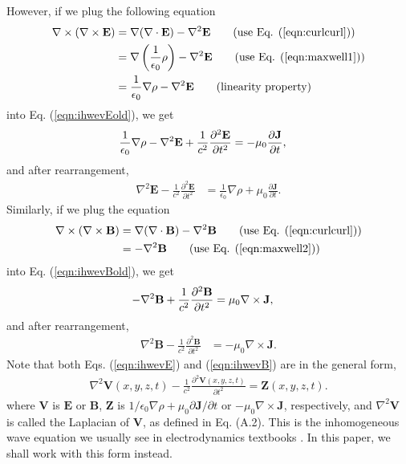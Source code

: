 \documentclass[11pt]{article}              %
\begin{document}
However, if we plug the following equation
\begin{align}
\nabla\times(\nabla\times{\mathbf E})&=\nabla(\nabla\cdot{\mathbf E})-\nabla^2{\mathbf E}\tag{use Eq. (\ref{eqn:curlcurl})}\\
&=\nabla\left(\frac{1}{\epsilon_0}\rho\right)-\nabla^2{\mathbf E}\tag{use Eq. (\ref{eqn:maxwell1})}\\
&=\frac{1}{\epsilon_0}\nabla\rho-\nabla^2{\mathbf E}\tag{linearity property}
\end{align}
into Eq. (\ref{eqn:ihwevEold}), we get
\begin{align}
    \frac{1}{\epsilon_0}\nabla\rho-\nabla^2{\mathbf E}+\frac{1}{c^2}\frac{\partial^2{\mathbf E}}{\partial t^2}&=-\mu_0\frac{\partial {\mathbf J}}{\partial t},\notag
\end{align}
and after rearrangement, 
\begin{align}
\nabla^2{\mathbf E}-\frac{1}{c^2}\frac{\partial^2{\mathbf E}}{\partial t^2}&=\frac{1}{\epsilon_0}\nabla\rho+\mu_0\frac{\partial{\mathbf J}}{\partial t}.\label{eqn:ihwevE}
\end{align}
Similarly, if we plug the equation
\begin{align}
\nabla\times(\nabla\times{\mathbf B})&=\nabla(\nabla\cdot{\mathbf B})-\nabla^2{\mathbf B}\tag{use Eq. (\ref{eqn:curlcurl})}\\
&=-\nabla^2{\mathbf B}\tag{use Eq. (\ref{eqn:maxwell2})}
\end{align}
into Eq. (\ref{eqn:ihwevBold}), we get
\begin{align}
    -\nabla^2{\mathbf B}+\frac{1}{c^2}\frac{\partial^2{\mathbf B}}{\partial t^2}&=\mu_0\nabla\times {\mathbf J},\notag
\end{align}
and after rearrangement,
\begin{align}    
\nabla^2{\mathbf B}-\frac{1}{c^2}\frac{\partial^2{\mathbf B}}{\partial t^2}&=-\mu_0\nabla\times {\mathbf J}.\label{eqn:ihwevB}
\end{align}
Note that both Eqs. (\ref{eqn:ihwevE}) and (\ref{eqn:ihwevB}) are in the general form, 
\begin{align}
	\nabla^2 {\mathbf V}(x,y,z,t) -\frac{1}{c^2}\frac{\partial^2 {\mathbf V}(x,y,z,t)}{\partial t^2}={\mathbf Z}(x,y,z,t).\label{eqn:ihwev}
\end{align}
where ${\mathbf V}$ is $\mathbf E$ or $\mathbf B$, ${\mathbf Z}$ is ${1}/{\epsilon_0}\nabla\rho+\mu_0{\partial {\mathbf J}}/{\partial t}$ or $-\mu_0\nabla\times {\mathbf J}$, respectively, and $\nabla^2 \mathbf{V}$ is called the Laplacian of $\mathbf{V}$, as defined in Eq. (A.2). This is the inhomogeneous wave equation we usually see in electrodynamics textbooks \cite {johnson1965field} \cite{lorrain1988electromagnetic}  \cite{westgard1995electrodynamics} \cite{brau2004modern} \cite{zangwill2013modern}. In this paper, we shall work with this form instead.
\end{document}

